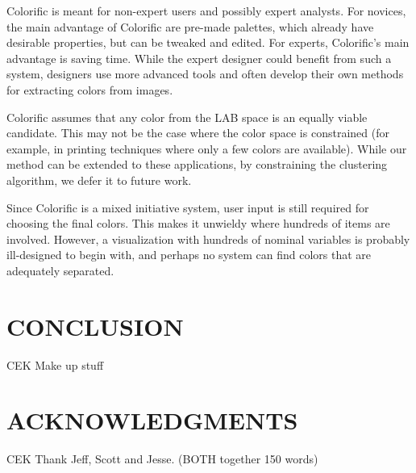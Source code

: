 \documentclass{article}
\newcommand{\system}{Colorific\xspace}
\begin{document}
 \system is meant for non-expert users and possibly expert analysts. 
 For novices, the main advantage of \system are pre-made palettes, which already have desirable properties, but can be tweaked and edited. For experts, \system's main advantage is saving time. While the expert designer could  benefit from such a system, designers use more advanced tools and often develop their own methods for extracting colors from images.
 
 \system assumes that any color from the LAB space is an equally viable candidate. This may not be the case where the color space is constrained (for example, in printing techniques where only a few colors are available). While our method can be extended to these applications, by constraining the clustering algorithm,  we defer it to future work.

 Since \system is a mixed initiative system, user input is still required for choosing the final colors. This makes it unwieldy where hundreds of items are involved. However, a visualization with hundreds of nominal variables is probably ill-designed to begin with, and perhaps no system can find colors that are adequately separated.

\section{CONCLUSION}
CEK Make up stuff

\section{ACKNOWLEDGMENTS} 
CEK Thank Jeff, Scott and Jesse.
(BOTH together 150 words)





\end{document}

